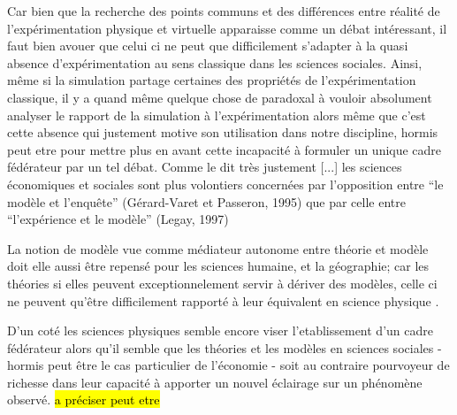 Car bien que la recherche des points communs et des différences entre réalité de l'expérimentation physique et virtuelle apparaisse comme un débat intéressant, il faut bien avouer que celui ci ne peut que difficilement s'adapter à la quasi absence d'expérimentation au sens classique dans les sciences sociales. Ainsi, même si la simulation partage certaines des propriétés de l'expérimentation classique, il y a quand même quelque chose de paradoxal à vouloir absolument analyser le rapport de la simulation à l'expérimentation alors même que c'est cette absence qui justement motive son utilisation dans notre discipline, hormis peut etre pour mettre plus en avant cette incapacité à formuler un unique cadre fédérateur par un tel débat. Comme le dit très justement \textcite{Phan2008} {[...] les sciences économiques et sociales sont plus volontiers concernées par l’opposition entre \enquote{le modèle et l’enquête}  (Gérard-Varet et Passeron, 1995) que par celle entre \enquote{l’expérience et le modèle} (Legay, 1997)}

La notion de modèle vue comme médiateur autonome entre théorie et modèle doit elle aussi être repensé pour les sciences humaine, et la géographie; car les théories si elles peuvent exceptionnelement servir à dériver des modèles, celle ci ne peuvent qu'être difficilement rapporté à leur équivalent en science physique \autocite{Pumain1997}.

D'un coté les sciences physiques semble encore viser l'etablissement d'un cadre fédérateur alors qu'il semble que les théories et les modèles en sciences sociales - hormis peut être le cas particulier de l'économie - soit au contraire pourvoyeur de richesse dans leur capacité à apporter un nouvel éclairage sur un phénomène observé. \hl{a préciser peut etre}

